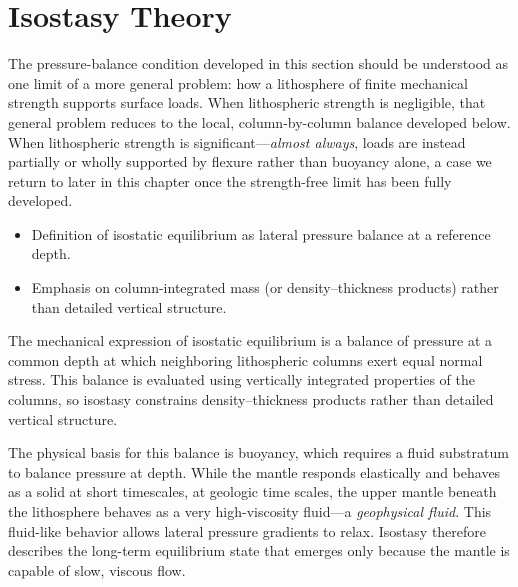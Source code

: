 \section{Isostasy Theory}
The pressure-balance condition developed in this section should be understood as one limit of a more general problem: how a lithosphere of finite mechanical strength supports surface loads. When lithospheric strength is negligible, that general problem reduces to the local, column-by-column balance developed below. When lithospheric strength is significant---\emph{almost always}, loads are instead partially or wholly supported by flexure rather than buoyancy alone, a case we return to later in this chapter once the strength-free limit has been fully developed.
\begin{itemize}
  \item Definition of isostatic equilibrium as lateral pressure balance at a reference depth.
  \item Emphasis on column-integrated mass (or density--thickness products) rather than detailed vertical structure.
\end{itemize}

The mechanical expression of isostatic equilibrium is a balance of pressure at a common depth at which neighboring lithospheric columns exert equal normal stress.  This balance is evaluated using vertically integrated properties of the columns, so isostasy constrains density--thickness products rather than detailed vertical structure.

The physical basis for this balance is buoyancy, which requires a fluid substratum to balance pressure at depth. While the mantle responds elastically and behaves as a solid at short timescales, at geologic time scales, the upper mantle beneath the lithosphere behaves as a very high-viscosity fluid---a \emph{geophysical fluid}.  This fluid-like behavior allows lateral pressure gradients to relax.  Isostasy therefore describes the long-term equilibrium state that emerges only because the mantle is capable of slow, viscous flow.

